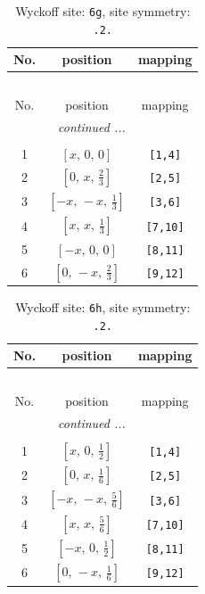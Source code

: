 \documentclass[fleqn,8pt]{jsarticle}
\begin{document}
\renewcommand{\arraystretch}{1.2}
\begin{longtable}{ccc}
\caption{Wyckoff site: {\tt 6g}, site symmetry: {\tt .2.}}
 \\
 \hline \hline
No. & position & mapping \\ \hline \endfirsthead

\multicolumn{2}{l}{\tablename\ \thetable{}} \\
 \hline \hline
No. & position & mapping \\ \hline \endhead

 \hline \hline
\multicolumn{2}{r}{\footnotesize\it continued ...} \\ \endfoot

 \hline \hline
\multicolumn{2}{r}{} \\ \endlastfoot

1 & $\left[ x,\, 0,\, 0 \right]$ & {\tt [1,4]} \\ \hline
2 & $\left[ 0,\, x,\, \frac{2}{3} \right]$ & {\tt [2,5]} \\ \hline
3 & $\left[ - x,\, - x,\, \frac{1}{3} \right]$ & {\tt [3,6]} \\ \hline
4 & $\left[ x,\, x,\, \frac{1}{3} \right]$ & {\tt [7,10]} \\ \hline
5 & $\left[ - x,\, 0,\, 0 \right]$ & {\tt [8,11]} \\ \hline
6 & $\left[ 0,\, - x,\, \frac{2}{3} \right]$ & {\tt [9,12]} \\
\end{longtable}
\renewcommand{\arraystretch}{1.2}
\begin{longtable}{ccc}
\caption{Wyckoff site: {\tt 6h}, site symmetry: {\tt .2.}}
 \\
 \hline \hline
No. & position & mapping \\ \hline \endfirsthead

\multicolumn{2}{l}{\tablename\ \thetable{}} \\
 \hline \hline
No. & position & mapping \\ \hline \endhead

 \hline \hline
\multicolumn{2}{r}{\footnotesize\it continued ...} \\ \endfoot

 \hline \hline
\multicolumn{2}{r}{} \\ \endlastfoot

1 & $\left[ x,\, 0,\, \frac{1}{2} \right]$ & {\tt [1,4]} \\ \hline
2 & $\left[ 0,\, x,\, \frac{1}{6} \right]$ & {\tt [2,5]} \\ \hline
3 & $\left[ - x,\, - x,\, \frac{5}{6} \right]$ & {\tt [3,6]} \\ \hline
4 & $\left[ x,\, x,\, \frac{5}{6} \right]$ & {\tt [7,10]} \\ \hline
5 & $\left[ - x,\, 0,\, \frac{1}{2} \right]$ & {\tt [8,11]} \\ \hline
6 & $\left[ 0,\, - x,\, \frac{1}{6} \right]$ & {\tt [9,12]} \\
\end{longtable}
\end{document}
